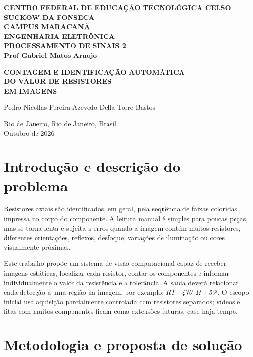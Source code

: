\documentclass[10pt,a4paper]{article}
\begin{document}
\hypersetup{pageanchor=false}

\begin{titlepage}
\thispagestyle{empty}
\centering
\vspace*{0.6cm}
{\small\bfseries CENTRO FEDERAL DE EDUCAÇÃO TECNOLÓGICA CELSO SUCKOW DA FONSECA\\[2pt]
CAMPUS MARACANÃ\\[2pt]
ENGENHARIA ELETRÔNICA\\[2pt]
PROCESSAMENTO DE SINAIS 2\\[2pt]
Prof Gabriel Matos Araujo}

\vfill
{\LARGE\bfseries
CONTAGEM E IDENTIFICAÇÃO AUTOMÁTICA\\[4pt]
DO VALOR DE RESISTORES\\[4pt]
EM IMAGENS}

\vfill
{\large Pedro Nicollas Pereira Azevedo Della Torre Bastos}

\vfill
Rio de Janeiro, Rio de Janeiro, Brasil\\[3pt]
Outubro de 2026
\end{titlepage}

\clearpage
\hypersetup{pageanchor=true}
\setcounter{page}{1}

\section{Introdução e descrição do problema}

Resistores axiais são identificados, em geral, pela sequência de faixas coloridas impressa no corpo do componente. A leitura manual é simples para poucas peças, mas se torna lenta e sujeita a erros quando a imagem contém muitos resistores, diferentes orientações, reflexos, desfoque, variações de iluminação ou cores visualmente próximas.

Este trabalho propõe um sistema de visão computacional capaz de receber imagens estáticas, localizar cada resistor, contar os componentes e informar individualmente o valor da resistência e a tolerância. A saída deverá relacionar cada detecção a uma região da imagem, por exemplo: \textit{R1 - 470~$\Omega$ $\pm$5\%}. O escopo inicial usa aquisição parcialmente controlada com resistores separados; vídeos e fitas com muitos componentes ficam como extensões futuras, caso haja tempo.

\section{Metodologia e proposta de solução}
\end{document}

